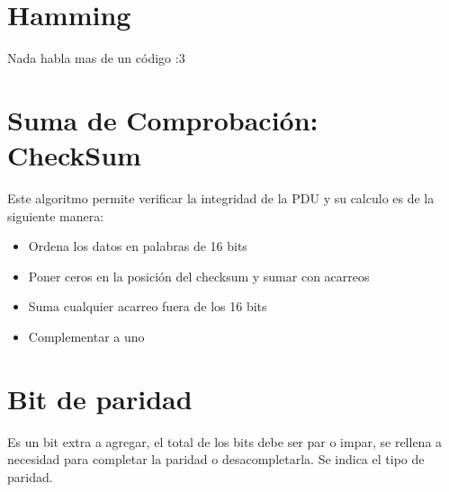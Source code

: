 \documentclass[12pt, fleqn]{report}                             %
\theoremstyle{break}                                            %
\begin{document}
        \section{Hamming}

            Nada habla mas de un código :3

            

        


    
        \clearpage
        \section{Suma de Comprobación: CheckSum}

            Este algoritmo permite verificar la integridad de la PDU y su calculo es de la siguiente manera:

            \begin{itemize}
                \item Ordena los datos en palabras de 16 bits
                \item Poner ceros en la posición del checksum y sumar con acarreos
                \item Suma cualquier acarreo fuera de los 16 bits
                \item Complementar a uno
            \end{itemize}





        \section{Bit de paridad}
        Es un bit extra a agregar, el total de los bits debe ser par o impar, se rellena a necesidad para completar la paridad o desacompletarla.
        Se indica el tipo de paridad.
\end{document}
